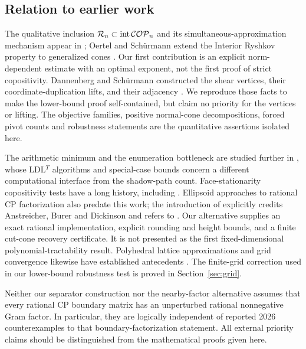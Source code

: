 \subsection{Relation to earlier work}
The qualitative inclusion $\mathcal R_n\subset\operatorname{int}\mathcal{COP}_n$ and its simultaneous-approximation mechanism appear in \cite{DSV17}; Oertel and Sch\"urmann extend the Interior Ryshkov property to generalized cones \cite{OS26}. Our first contribution is an explicit norm-dependent estimate with an optimal exponent, not the first proof of strict copositivity. Dannenberg and Sch\"urmann constructed the shear vertices, their coordinate-duplication lifts, and their adjacency \cite[Section~5]{DS23}. We reproduce those facts to make the lower-bound proof self-contained, but claim no priority for the vertices or lifting. The objective families, positive normal-cone decompositions, forced pivot counts and robustness statements are the quantitative assertions isolated here.

The arithmetic minimum and the enumeration bottleneck are studied further in \cite{OS25}, whose LDL$^T$ algorithms and special-case bounds concern a different computational interface from the shadow-path count. Face-stationarity copositivity tests have a long history, including \cite{Valiaho89,HCGT22}. Ellipsoid approaches to rational CP factorization also predate this work; the introduction of \cite{DSV21} explicitly credits Anstreicher, Burer and Dickinson and refers to \cite[Section~3.3]{Dickinson13}. Our alternative supplies an exact rational implementation, explicit rounding and height bounds, and a finite cut-cone recovery certificate. It is not presented as the first fixed-dimensional polynomial-tractability result. Polyhedral lattice approximations and grid convergence likewise have established antecedents \cite{Yildirim12,DKLS15,DKLSV17}. The finite-grid correction used in our lower-bound robustness test is proved in Section~\ref{sec:grid}.

Neither our separator construction nor the nearby-factor alternative assumes that every rational CP boundary matrix has an unperturbed rational nonnegative Gram factor. In particular, they are logically independent of reported 2026 counterexamples to that boundary-factorization statement. All external priority claims should be distinguished from the mathematical proofs given here.

